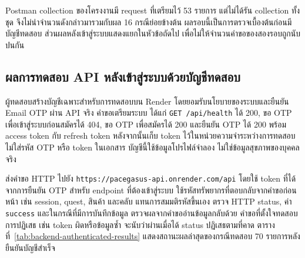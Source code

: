 Postman collection ของโครงงานมี request ที่เตรียมไว้ 53 รายการ แต่ไม่ได้รัน collection ทั้งชุด จึงไม่นำจำนวนดังกล่าวมารวมกับผล 16 กรณีย่อยข้างต้น ผลรอบนี้เป็นการตรวจเบื้องต้นก่อนมีบัญชีทดสอบ ส่วนผลหลังเข้าสู่ระบบแสดงแยกในหัวข้อถัดไป เพื่อไม่ให้จำนวนคำขอของสองรอบถูกนับปนกัน

\subsection{ผลการทดสอบ API หลังเข้าสู่ระบบด้วยบัญชีทดสอบ}

ผู้ทดสอบสร้างบัญชีเฉพาะสำหรับการทดสอบบน Render โดยยอมรับนโยบายของระบบและยืนยัน Email OTP ผ่าน API จริง คำขอเตรียมระบบ ได้แก่ \texttt{GET /api/health} ได้ 200, ขอ OTP เพื่อเข้าสู่ระบบก่อนสมัครได้ 404, ขอ OTP เพื่อสมัครได้ 200 และยืนยัน OTP ได้ 200 พร้อม access token กับ refresh token หลังจากนั้นเก็บ token ไว้ในหน่วยความจำระหว่างการทดสอบ ไม่ใส่รหัส OTP หรือ token ในเอกสาร บัญชีนี้ใช้ข้อมูลโปรไฟล์จำลอง ไม่ใช่ข้อมูลสุขภาพของบุคคลจริง

ส่งคำขอ HTTP ไปยัง \texttt{https://pacegasus-api.onrender.com/api} โดยใช้ token ที่ได้จากการยืนยัน OTP สำหรับ endpoint ที่ต้องเข้าสู่ระบบ ใช้รหัสทรัพยากรที่ตอบกลับจากคำขอก่อนหน้า เช่น session, quest, สินค้า และคลับ แทนการสมมติรหัสขึ้นเอง ตรวจ HTTP status, ค่า \texttt{success} และในกรณีที่มีการบันทึกข้อมูล ตรวจผลจากคำขออ่านข้อมูลกลับด้วย คำขอที่ตั้งใจทดสอบการปฏิเสธ เช่น token ผิดหรือข้อมูลซ้ำ จะนับว่าผ่านเมื่อได้ status ปฏิเสธตามที่คาด ตารางที่~\ref{tab:backend-authenticated-results} แสดงสถานะผลล่าสุดของกรณีทดสอบ 70 รายการหลังยืนยันบัญชีสำเร็จ


